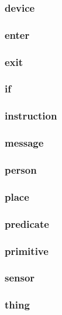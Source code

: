 \documentclass{article}
\begin{document}
\subsubsection*{device}

\subsubsection*{enter}

\subsubsection*{exit}

\subsubsection*{if}

\subsubsection*{instruction}

\subsubsection*{message}

\subsubsection*{person}

\subsubsection*{place}

\subsubsection*{predicate}

\subsubsection*{primitive}

\subsubsection*{sensor}

\subsubsection*{thing}
\end{document}
